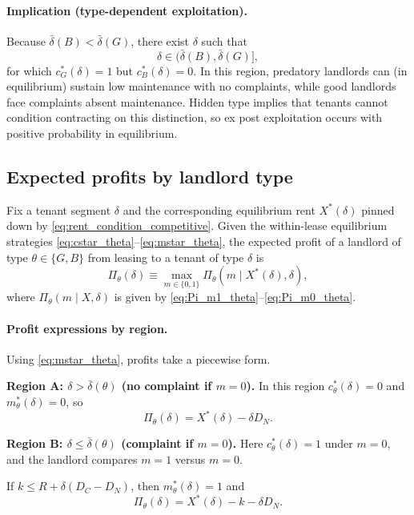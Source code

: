 \documentclass[11pt]{article}
\begin{document}
\paragraph{Implication (type-dependent exploitation).}
Because $\bar\delta(B)<\bar\delta(G)$, there exist $\delta$ such that
\[
\delta \in (\bar\delta(B),\bar\delta(G)],
\]
for which $c^*_G(\delta)=1$ but $c^*_B(\delta)=0$. In this region, predatory landlords can (in equilibrium) sustain low maintenance with no complaints, while good landlords face complaints absent maintenance. Hidden type implies that tenants cannot condition contracting on this distinction, so ex post exploitation occurs with positive probability in equilibrium.


\subsection{Expected profits by landlord type}
\label{sec:profits_by_type}

Fix a tenant segment $\delta$ and the corresponding equilibrium rent $X^*(\delta)$ pinned down by \eqref{eq:rent_condition_competitive}. Given the within-lease equilibrium strategies \eqref{eq:cstar_theta}--\eqref{eq:mstar_theta}, the expected profit of a landlord of type $\theta\in\{G,B\}$ from leasing to a tenant of type $\delta$ is
\[
\Pi_\theta(\delta)\equiv \max_{m\in\{0,1\}} \Pi_\theta(m\mid X^*(\delta),\delta),
\]
where $\Pi_\theta(m\mid X,\delta)$ is given by \eqref{eq:Pi_m1_theta}--\eqref{eq:Pi_m0_theta}.

\paragraph{Profit expressions by region.}
Using \eqref{eq:mstar_theta}, profits take a piecewise form.

\medskip
\noindent\textbf{Region A: $\delta > \bar\delta(\theta)$ (no complaint if $m=0$).}
In this region $c^*_\theta(\delta)=0$ and $m^*_\theta(\delta)=0$, so
\begin{equation}
\Pi_\theta(\delta)= X^*(\delta) - \delta D_N.
\label{eq:profit_regionA}
\end{equation}

\medskip
\noindent\textbf{Region B: $\delta \le \bar\delta(\theta)$ (complaint if $m=0$).}
Here $c^*_\theta(\delta)=1$ under $m=0$, and the landlord compares $m=1$ versus $m=0$.

If $k \le R + \delta(D_C-D_N)$, then $m^*_\theta(\delta)=1$ and
\begin{equation}
\Pi_\theta(\delta)= X^*(\delta) - k - \delta D_N.
\label{eq:profit_regionB_maintain}
\end{equation}
\end{document}
